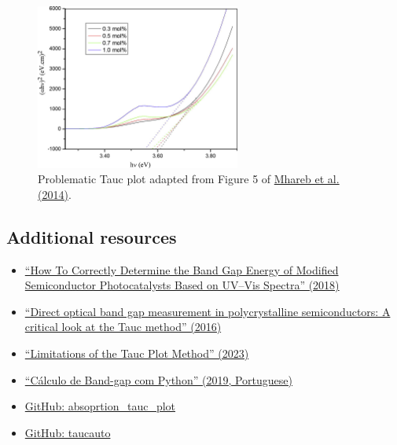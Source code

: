 \documentclass[letterpaper, 12pt]{article}
\begin{document}
\begin{figure}[h!tbp]
    \centering
    \includegraphics[width=0.6\textwidth]{img/tauc/1-s2.0-S0925346714003255-gr5_lrg.jpg}
    \caption*{Problematic Tauc plot adapted from Figure 5 of \href{https://doi.org/10.1016/j.optmat.2014.06.033}{Mhareb et al. (2014)}.}
\end{figure}

\subsection*{Additional resources}

\begin{itemize}
    \setlength\itemsep{-0.5em}
    \item \href{https://doi.org/10.1021/acs.jpclett.8b02892}{``How To Correctly Determine the Band Gap Energy of Modified Semiconductor Photocatalysts Based on UV–Vis Spectra'' (2018)}
    \item \href{https://doi.org/10.1016/j.jssc.2016.05.010}{``Direct optical band gap measurement in polycrystalline semiconductors: A critical look at the Tauc method'' (2016)}
    \item \href{https://doi.org/10.1002/adfm.202304523}{``Limitations of the Tauc Plot Method'' (2023)}
    \item \href{https://gepac.github.io/2019-06-07-projeto-bandGap/}{``C\'alculo de Band-gap com Python'' (2019, Portuguese)}
    \item \href{https://github.com/alexey-krasnov/absorption_tauc_plot}{GitHub: absoprtion\_tauc\_plot}
    \item \href{https://github.com/LiamWilbraham/taucauto}{GitHub: taucauto}
\end{itemize}
\end{document}
